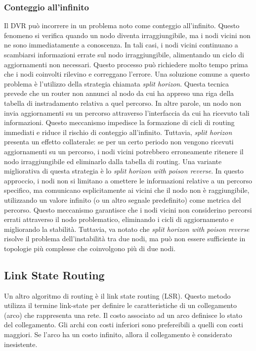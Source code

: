 \documentclass[12pt]{report}
\begin{document}
\subsubsection{Conteggio all'infinito}
Il DVR può incorrere in un problema noto come conteggio all'infinito. Questo fenomeno si verifica quando un nodo diventa irraggiungibile, ma i nodi vicini non ne sono immediatamente a conoscenza. In tali casi, i nodi vicini continuano a scambiarsi informazioni errate sul nodo irraggiungibile, alimentando un ciclo di aggiornamenti non necessari. Questo processo può richiedere molto tempo prima che i nodi coinvolti rilevino e correggano l'errore.
Una soluzione comune a questo problema è l'utilizzo della strategia chiamata \textit{split horizon}. Questa tecnica prevede che un router non annunci al nodo da cui ha appreso una riga della tabella di instradamento relativa a quel percorso. In altre parole, un nodo non invia aggiornamenti su un percorso attraverso l'interfaccia da cui ha ricevuto tali informazioni. Questo meccanismo impedisce la formazione di cicli di routing immediati e riduce il rischio di conteggio all'infinito. Tuttavia, \textit{split horizon} presenta un effetto collaterale: se per un certo periodo non vengono ricevuti aggiornamenti su un percorso, i nodi vicini potrebbero erroneamente ritenere il nodo irraggiungibile ed eliminarlo dalla tabella di routing. Una variante migliorativa di questa strategia è lo \textit{split horizon with poison reverse}. In questo approccio, i nodi non si limitano a omettere le informazioni relative a un percorso specifico, ma comunicano esplicitamente ai vicini che il nodo non è raggiungibile, utilizzando un valore infinito (o un altro segnale predefinito) come metrica del percorso. Questo meccanismo garantisce che i nodi vicini non considerino percorsi errati attraverso il nodo problematico, eliminando i cicli di aggiornamento e migliorando la stabilità. Tuttavia, va notato che \textit{split horizon with poison reverse} risolve il problema dell'instabilità tra due nodi, ma può non essere sufficiente in topologie più complesse che coinvolgono più di due nodi.

\subsection{Link State Routing}
Un altro algoritmo di routing è il link state routing (LSR). Questo metodo utilizza il termine link-state per definire le caratteristiche di un collegamento (arco) che rappresenta una rete. Il costo associato ad un arco definisce lo stato del collegamento. Gli archi con costi inferiori sono prefereibili a quelli con costi maggiori. Se l'arco ha un costo infinito, allora il collegamento è considerato inesistente.
\end{document}
